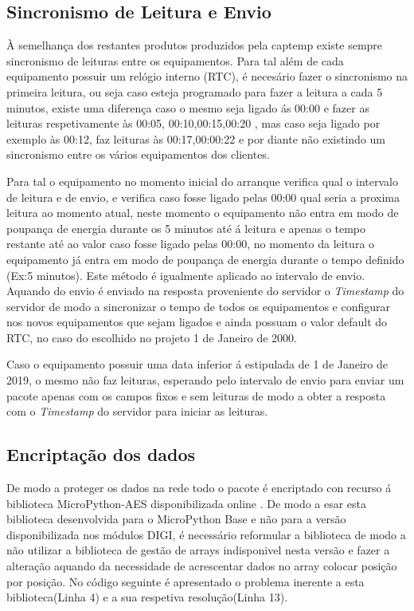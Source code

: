 \subsection {Sincronismo de Leitura e Envio} \label{sinc}

\par À semelhança dos restantes produtos produzidos pela captemp existe sempre sincronismo de leituras entre os equipamentos. Para tal além de cada equipamento possuir um relógio interno (RTC), é necesário fazer o sincronismo na primeira leitura, ou seja caso esteja programado para fazer a leitura a cada 5 minutos, existe uma diferença caso o mesmo seja ligado ás 00:00 e fazer as leituras respetivamente às 00:05, 00:10,00:15,00:20 , mas caso seja ligado por exemplo às 00:12, faz leituras às 00:17,00:00:22 e por diante não existindo um sincronismo entre os vários equipamentos dos clientes.
\par Para tal o equipamento no momento inicial do arranque verifica qual o intervalo de leitura e de envio, e verifica caso fosse ligado pelas 00:00 qual seria a proxima leitura ao momento atual, neste momento o equipamento não entra em modo de poupança de energia durante os 5 minutos até á leitura e apenas o tempo restante até ao valor caso fosse ligado pelas 00:00, no momento da leitura o equipamento já entra em modo de poupança de energia durante o tempo definido (Ex:5 minutos). Este método é igualmente aplicado ao intervalo de envio. Aquando do envio é enviado na resposta proveniente do servidor o \textit{Timestamp} do servidor de modo a sincronizar o tempo de todos os equipamentos e configurar nos novos equipamentos que sejam ligados e ainda possuam o valor default do RTC, no caso do escolhido no projeto 1 de Janeiro de 2000.
\par Caso o equipamento possuir uma data inferior á estipulada de 1 de Janeiro de 2019, o mesmo não faz leituras, esperando pelo intervalo de envio para enviar um pacote apenas com os campos fixos e sem leituras de modo a obter a resposta com o \textit{Timestamp} do servidor para iniciar as leituras.


\subsection {Encriptação dos dados}

\par De modo a proteger os dados na rede todo o pacote é encriptado con recurso á biblioteca MicroPython-AES disponibilizada online \cite{microaes}. De modo a esar esta biblioteca desenvolvida para o MicroPython Base e não para a versão disponibilizada nos módulos DIGI, é necessário reformular a biblioteca de modo a  não utilizar a biblioteca de gestão de arrays  indisponivel nesta versão e fazer a alteração aquando da necessidade de acrescentar dados no array colocar posição por posição.  No código seguinte é apresentado o problema inerente a esta biblioteca(Linha 4) e a sua respetiva resolução(Linha 13).


